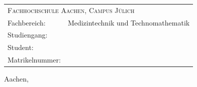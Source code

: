 %
\begin{titlepage}
	\begin{flushright}
		\textbf{\Large \documentTitle}
		\linebreak
		\linebreak
		\textbf{\Large \documentTypeName}
		\linebreak
		\linebreak
	\end{flushright}
	\vfill
	\begin{tabular*}{\linewidth}{ll}
	    \multicolumn{2}{l}{\textsc{Fachhochschule Aachen, Campus Jülich}}\\
		Fachbereich: & Medizintechnik und Technomathematik\\
		Studiengang: & \studiengang\\
		Student: & \authorOfWork\\ 
		Matrikelnummer: & \matrikelnummer
	\end{tabular*}
	\vfill	
	\centering\large Aachen, \dateOfSubmission %
\end{titlepage}